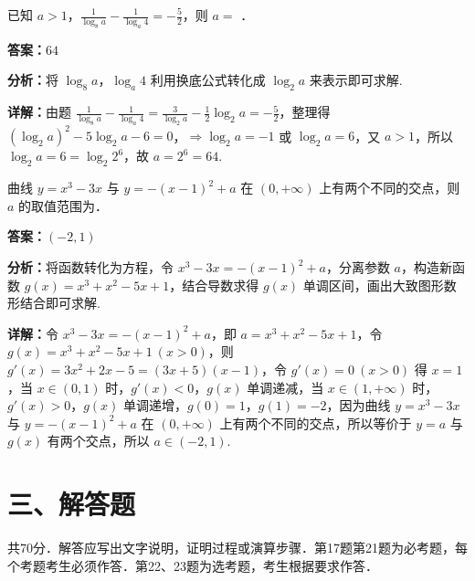 \begin{question}[points=5]
已知 $a > 1$，$\frac{1}{\log_8 a} - \frac{1}{\log_a 4} = -\frac{5}{2}$，则 $a =$ ．
\fillin[{$64$}]
\begin{solution}
\textbf{答案：}$64$

\textbf{分析：}将 $\log_8 a$，$\log_a 4$ 利用换底公式转化成 $\log_2 a$ 来表示即可求解.

\textbf{详解：}由题 $\frac{1}{\log_8 a} - \frac{1}{\log_a 4} = \frac{3}{\log_2 a} - \frac{1}{2}\log_2 a = -\frac{5}{2}$，整理得 $(\log_2 a)^2 - 5\log_2 a - 6 = 0$，$\Rightarrow \log_2 a = -1$ 或 $\log_2 a = 6$，又 $a > 1$，所以 $\log_2 a = 6 = \log_2 2^6$，故 $a = 2^6 = 64$.
\end{solution}
\end{question}

\begin{question}[points=5]
曲线 $y = x^3 - 3x$ 与 $y = -(x-1)^2 + a$ 在 $(0, +\infty)$ 上有两个不同的交点，则 $a$ 的取值范围为．
\fillin[{$(-2, 1)$}]
\begin{solution}
\textbf{答案：}$(-2, 1)$

\textbf{分析：}将函数转化为方程，令 $x^3 - 3x = -(x-1)^2 + a$，分离参数 $a$，构造新函数 $g(x) = x^3 + x^2 - 5x + 1$，结合导数求得 $g(x)$ 单调区间，画出大致图形数形结合即可求解.

\textbf{详解：}令 $x^3 - 3x = -(x-1)^2 + a$，即 $a = x^3 + x^2 - 5x + 1$，令 $g(x) = x^3 + x^2 - 5x + 1 \ (x > 0)$，则 $g'(x) = 3x^2 + 2x - 5 = (3x+5)(x-1)$，令 $g'(x) = 0 \ (x > 0)$ 得 $x = 1$，当 $x \in (0,1)$ 时，$g'(x) < 0$，$g(x)$ 单调递减，当 $x \in (1, +\infty)$ 时，$g'(x) > 0$，$g(x)$ 单调递增，$g(0) = 1$，$g(1) = -2$，因为曲线 $y = x^3 - 3x$ 与 $y = -(x-1)^2 + a$ 在 $(0, +\infty)$ 上有两个不同的交点，所以等价于 $y = a$ 与 $g(x)$ 有两个交点，所以 $a \in (-2, 1)$.
\end{solution}
\end{question}

\section*{三、解答题}
共70分．解答应写出文字说明，证明过程或演算步骤．第17题第21题为必考题，每个考题考生必须作答．第22、23题为选考题，考生根据要求作答．


